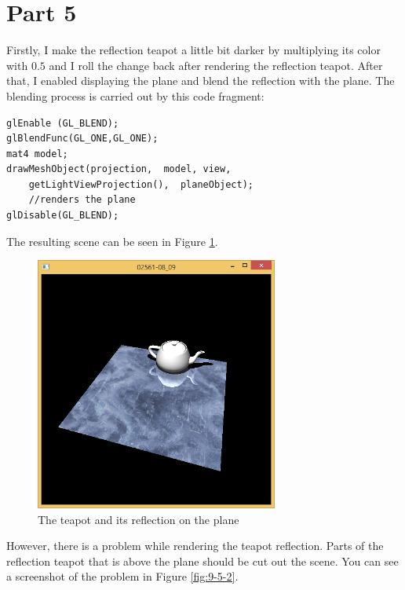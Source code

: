 \section{Part 5}

Firstly, I make the reflection teapot a little bit darker by multiplying its color with $0.5$ and I roll the change back after rendering the reflection teapot. After that, I enabled displaying the plane and blend the reflection with the plane. The blending process is carried out by this code fragment: \\

\begin{lstlisting}
glEnable (GL_BLEND);
glBlendFunc(GL_ONE,GL_ONE);
mat4 model;
drawMeshObject(projection,  model, view, 
    getLightViewProjection(),  planeObject);
    //renders the plane
glDisable(GL_BLEND);
\end{lstlisting}
\smallskip
\noindent
The resulting scene can be seen in Figure \ref{fig:9-5-1}.

\begin{figure}[hp]
\centering
\includegraphics[width=8cm]{../Screenshots/ex-9b/5-1.png}
\caption{The teapot and its reflection on the plane}
\label{fig:9-5-1}
\end{figure}

However, there is a problem while rendering the teapot reflection. Parts of the reflection teapot that is above the plane should be cut out the scene. You can see a screenshot of the problem in Figure \ref{fig:9-5-2}. 


